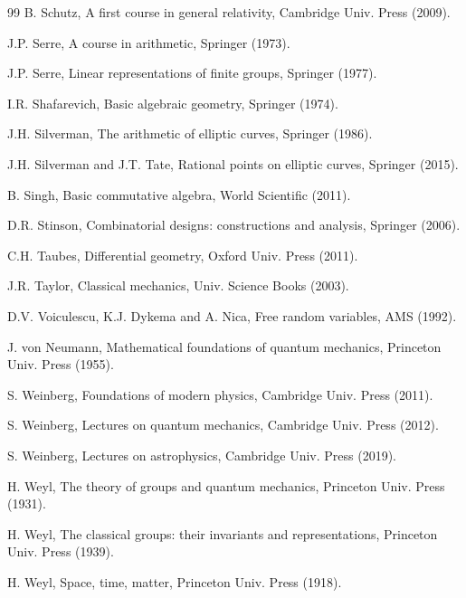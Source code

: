 \documentclass[12pt]{amsbook}
\begin{document}
\begin{thebibliography}{99}
B. Schutz, A first course in general relativity, Cambridge Univ. Press (2009).

J.P. Serre, A course in arithmetic, Springer (1973).

J.P. Serre, Linear representations of finite groups, Springer (1977).

I.R. Shafarevich, Basic algebraic geometry, Springer (1974).

J.H. Silverman, The arithmetic of elliptic curves, Springer (1986).

J.H. Silverman and J.T. Tate, Rational points on elliptic curves, Springer (2015).

B. Singh, Basic commutative algebra, World Scientific (2011).

D.R. Stinson, Combinatorial designs: constructions and analysis, Springer (2006).

C.H. Taubes, Differential geometry, Oxford Univ. Press (2011). 

J.R. Taylor, Classical mechanics, Univ. Science Books (2003).

D.V. Voiculescu, K.J. Dykema and A. Nica, Free random variables, AMS (1992).

J. von Neumann, Mathematical foundations of quantum mechanics, Princeton Univ. Press (1955).

S. Weinberg, Foundations of modern physics, Cambridge Univ. Press (2011).

S. Weinberg, Lectures on quantum mechanics, Cambridge Univ. Press (2012).

S. Weinberg, Lectures on astrophysics, Cambridge Univ. Press (2019).

H. Weyl, The theory of groups and quantum mechanics, Princeton Univ. Press (1931).

H. Weyl, The classical groups: their invariants and representations, Princeton Univ. Press (1939).

H. Weyl, Space, time, matter, Princeton Univ. Press (1918).

\end{thebibliography}

\baselineskip=14pt

\printindex
\end{document}
